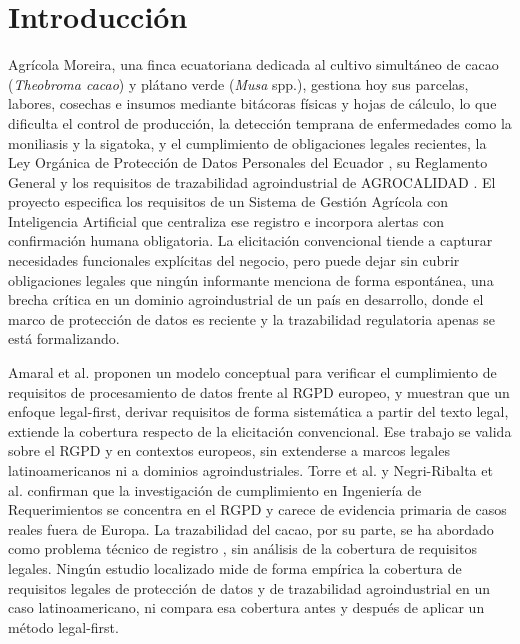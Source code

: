 \documentclass[pdflatex,sn-mathphys-num]{sn-jnl}
\begin{document}

\maketitle

\section{Introducci\'on}\label{sec:introduccion}

Agr\'icola Moreira, una finca ecuatoriana dedicada al cultivo simult\'aneo de cacao (\textit{Theobroma cacao}) y pl\'atano verde (\textit{Musa} spp.), gestiona hoy sus parcelas, labores, cosechas e insumos mediante bit\'acoras f\'isicas y hojas de c\'alculo, lo que dificulta el control de producci\'on, la detecci\'on temprana de enfermedades como la moniliasis y la sigatoka, y el cumplimiento de obligaciones legales recientes, la Ley Org\'anica de Protecci\'on de Datos Personales del Ecuador \cite{lopdp2021}, su Reglamento General \cite{rlopdp2023} y los requisitos de trazabilidad agroindustrial de AGROCALIDAD \cite{agrocalidad183}. El proyecto especifica los requisitos de un Sistema de Gesti\'on Agr\'icola con Inteligencia Artificial que centraliza ese registro e incorpora alertas con confirmaci\'on humana obligatoria. La elicitaci\'on convencional tiende a capturar necesidades funcionales expl\'icitas del negocio, pero puede dejar sin cubrir obligaciones legales que ning\'un informante menciona de forma espont\'anea, una brecha cr\'itica en un dominio agroindustrial de un pa\'is en desarrollo, donde el marco de protecci\'on de datos es reciente y la trazabilidad regulatoria apenas se est\'a formalizando.

Amaral et al. \cite{amaral2021} proponen un modelo conceptual para verificar el cumplimiento de requisitos de procesamiento de datos frente al RGPD europeo, y muestran que un enfoque legal-first, derivar requisitos de forma sistem\'atica a partir del texto legal, extiende la cobertura respecto de la elicitaci\'on convencional. Ese trabajo se valida sobre el RGPD y en contextos europeos, sin extenderse a marcos legales latinoamericanos ni a dominios agroindustriales. Torre et al. \cite{torre2021} y Negri-Ribalta et al. \cite{negriribalta2024} confirman que la investigaci\'on de cumplimiento en Ingenier\'ia de Requerimientos se concentra en el RGPD y carece de evidencia primaria de casos reales fuera de Europa. La trazabilidad del cacao, por su parte, se ha abordado como problema t\'ecnico de registro \cite{arsyad2018,marchese2022}, sin an\'alisis de la cobertura de requisitos legales. Ning\'un estudio localizado mide de forma emp\'irica la cobertura de requisitos legales de protecci\'on de datos y de trazabilidad agroindustrial en un caso latinoamericano, ni compara esa cobertura antes y despu\'es de aplicar un m\'etodo legal-first.
\end{document}
